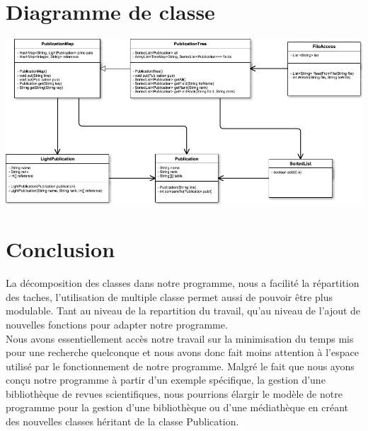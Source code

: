 \documentclass[10pt,a4paper]{article}
\begin{document}
\section*{Diagramme de classe}
\begin{center}
    \includegraphics[scale=0.5]{UML.png}
\end{center}

\section*{Conclusion}
La décomposition des classes dans notre programme, nous a facilité la répartition des taches, l'utilisation de multiple classe permet aussi de pouvoir être plus modulable. Tant au niveau de la repartition du travail, qu'au niveau de l'ajout de nouvelles fonctions pour adapter notre programme.\\
Nous avons essentiellement accès notre travail sur la minimisation du temps mis pour une recherche quelconque et nous avons donc fait moins attention à l'espace utilisé par le fonctionnement de notre programme.
Malgré le fait que nous ayons conçu notre programme à partir d'un exemple spécifique, la gestion d'une bibliothèque de revues scientifiques, nous pourrions élargir le modèle de notre programme pour la gestion d'une bibliothèque ou d'une médiathèque en créant des nouvelles classes héritant de la classe Publication.
\end{document}
